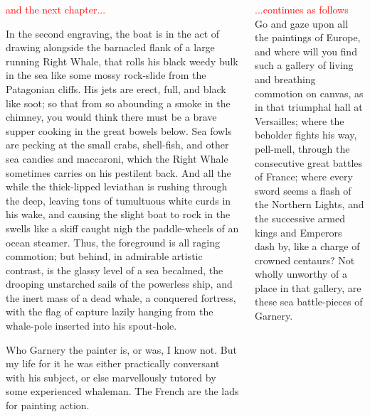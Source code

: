 \documentclass[final]{beamer}
\begin{document}
\begin{frame}{}
\begin{block}
\begin{columns}
\begin{column}{.49\textwidth}
\end{column}

\end{columns}
\end{block}
\begin{columns}

\begin{column}{.49\textwidth}
\begin{block}{\textcolor{red}{and the next chapter...}}

In the second engraving, the boat is in the act of drawing alongside the barnacled flank of a large running Right Whale, that rolls his black weedy bulk in the sea like some mossy rock-slide from the Patagonian cliffs. His jets are erect, full, and black like soot; so that from so abounding a smoke in the chimney, you would think there must be a brave supper cooking in the great bowels below. Sea fowls are pecking at the small crabs, shell-fish, and other sea candies and maccaroni, which the Right Whale sometimes carries on his pestilent back. And all the while the thick-lipped leviathan is rushing through the deep, leaving tons of tumultuous white curds in his wake, and causing the slight boat to rock in the swells like a skiff caught nigh the paddle-wheels of an ocean steamer. Thus, the foreground is all raging commotion; but behind, in admirable artistic contrast, is the glassy level of a sea becalmed, the drooping unstarched sails of the powerless ship, and the inert mass of a dead whale, a conquered fortress, with the flag of capture lazily hanging from the whale-pole inserted into his spout-hole.

\end{block}
Who Garnery the painter is, or was, I know not. But my life for it he was either practically conversant with his subject, or else marvellously tutored by some experienced whaleman. The French are the lads for painting action. 
\end{column}


\begin{column}{.49\textwidth}
\begin{block}{\textcolor{red}{...continues as follows}}
Go and gaze upon all the paintings of Europe, and where will you find such a gallery of living and breathing commotion on canvas, as in that triumphal hall at Versailles; where the beholder fights his way, pell-mell, through the consecutive great battles of France; where every sword seems a flash of the Northern Lights, and the successive armed kings and Emperors dash by, like a charge of crowned centaurs? Not wholly unworthy of a place in that gallery, are these sea battle-pieces of Garnery.



\end{block}
\end{column}
\end{columns}
\end{frame}
\end{document}
